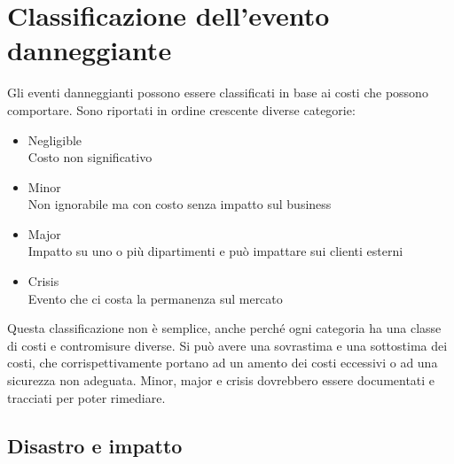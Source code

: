 \section{Classificazione dell'evento danneggiante}

Gli eventi danneggianti possono essere classificati in base ai costi
che possono comportare. Sono riportati in ordine crescente diverse categorie:

\begin{itemize}
\item Negligible \\
Costo non significativo
\item Minor \\
Non ignorabile ma con costo senza impatto sul business
\item Major \\
Impatto su uno o più dipartimenti e può impattare sui clienti esterni
\item Crisis \\
Evento che ci costa la permanenza sul mercato
\end{itemize}

Questa classificazione non è semplice, anche perché ogni categoria ha una 
classe di costi e contromisure diverse. Si può avere una sovrastima e una 
sottostima dei costi, che corrispettivamente portano ad un amento dei costi 
eccessivi o ad una sicurezza non adeguata.
Minor, major e crisis dovrebbero essere documentati e tracciati per poter 
rimediare.

\subsection{Disastro e impatto}

